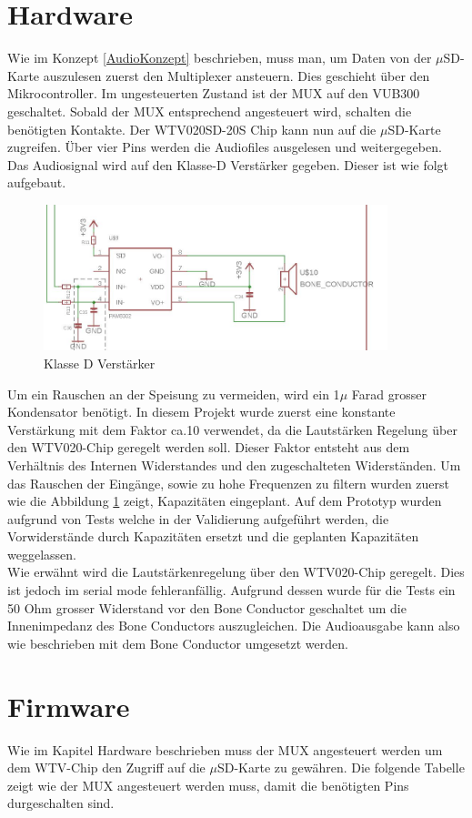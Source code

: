 \section{Hardware}
Wie im Konzept \ref{AudioKonzept}
 beschrieben, muss man, um Daten von der $\mu$SD-Karte auszulesen zuerst den Multiplexer ansteuern. Dies geschieht über den Mikrocontroller. Im ungesteuerten Zustand ist der MUX auf den VUB300 geschaltet. Sobald der MUX entsprechend angesteuert wird, schalten die benötigten Kontakte. Der WTV020SD-20S Chip kann nun auf die $\mu$SD-Karte zugreifen. Über vier Pins werden die Audiofiles ausgelesen und weitergegeben. Das Audiosignal wird auf den Klasse-D Verstärker gegeben. Dieser ist wie folgt aufgebaut.
\begin{figure}[h!]
	\centering
	\includegraphics[width=10cm]{Bilder/Klasse-D.jpg}
	\caption{Klasse D Verstärker}
	\label{Klasse-D}
\end{figure}


Um ein Rauschen an der Speisung zu vermeiden, wird ein 1$\mu$ Farad grosser Kondensator benötigt. In diesem Projekt wurde zuerst eine konstante Verstärkung mit dem Faktor ca.10 verwendet, da die Lautstärken Regelung über den WTV020-Chip geregelt werden soll. Dieser Faktor entsteht aus dem Verhältnis des Internen Widerstandes und den zugeschalteten Widerständen. Um das Rauschen der Eingänge, sowie zu hohe Frequenzen zu filtern wurden zuerst wie die Abbildung \ref{Klasse-D} zeigt, Kapazitäten eingeplant. Auf dem Prototyp wurden aufgrund von Tests welche in der Validierung aufgeführt werden, die Vorwiderstände durch Kapazitäten ersetzt und die geplanten Kapazitäten weggelassen.\\ Wie erwähnt wird die Lautstärkenregelung über den WTV020-Chip geregelt. Dies ist jedoch im serial mode fehleranfällig. Aufgrund dessen wurde für die Tests ein 50 Ohm grosser Widerstand vor den Bone Conductor geschaltet um die Innenimpedanz des Bone Conductors auszugleichen. Die Audioausgabe kann also wie beschrieben mit dem Bone Conductor umgesetzt werden.

\section{Firmware}
Wie im Kapitel Hardware beschrieben muss der MUX angesteuert werden um dem WTV-Chip den Zugriff auf die $\mu$SD-Karte zu gewähren. Die folgende Tabelle zeigt wie der MUX angesteuert werden muss, damit die benötigten Pins durgeschalten sind.

